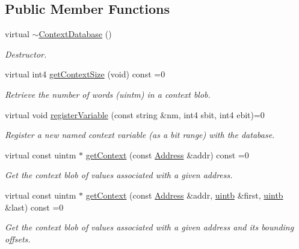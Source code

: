 \subsection*{Public Member Functions}
\begin{DoxyCompactItemize}
\item 
virtual \mbox{\hyperlink{class_context_database_a1700beca09c54b649aa4f68b8c850795}{$\sim$\+Context\+Database}} ()
\begin{DoxyCompactList}\small\item\em Destructor. \end{DoxyCompactList}\item 
virtual int4 \mbox{\hyperlink{class_context_database_add56654146d3e6d9bab727980fd1da28}{get\+Context\+Size}} (void) const =0
\begin{DoxyCompactList}\small\item\em Retrieve the number of words (uintm) in a context {\itshape blob}. \end{DoxyCompactList}\item 
virtual void \mbox{\hyperlink{class_context_database_a990c6b94512bff06a37d4b59b7316a4f}{register\+Variable}} (const string \&nm, int4 sbit, int4 ebit)=0
\begin{DoxyCompactList}\small\item\em Register a new named context variable (as a bit range) with the database. \end{DoxyCompactList}\item 
virtual const uintm $\ast$ \mbox{\hyperlink{class_context_database_a780d39f9c8f7bafe9bbb7eb948d3f9ca}{get\+Context}} (const \mbox{\hyperlink{class_address}{Address}} \&addr) const =0
\begin{DoxyCompactList}\small\item\em Get the context blob of values associated with a given address. \end{DoxyCompactList}\item 
virtual const uintm $\ast$ \mbox{\hyperlink{class_context_database_adbc2e2f157fe56f212f0edb55435dd7d}{get\+Context}} (const \mbox{\hyperlink{class_address}{Address}} \&addr, \mbox{\hyperlink{types_8h_a2db313c5d32a12b01d26ac9b3bca178f}{uintb}} \&first, \mbox{\hyperlink{types_8h_a2db313c5d32a12b01d26ac9b3bca178f}{uintb}} \&last) const =0
\begin{DoxyCompactList}\small\item\em Get the context blob of values associated with a given address and its bounding offsets. \end{DoxyCompactList}\item 

\end{DoxyCompactItemize}
